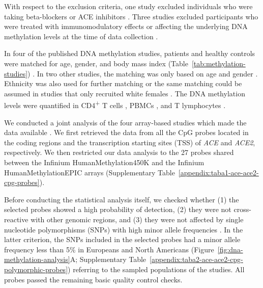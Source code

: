 With respect to the exclusion criteria, one study excluded individuals who were taking beta-blockers or ACE inhibitors \citep{trivedi2018IdentificationMyalgic}. Three studies excluded participants who were treated with immunomodulatory effects or affecting the underlying DNA methylation levels at the time of data collection \citep{vegaDNAMethylationModifications2014, vegaEpigeneticModificationsGlucocorticoid2017, herrera2018GenomeepigenomeInteractions}.

In four of the published DNA methylation studies, patients and healthy controls were matched for age, gender, and body mass index (Table~\ref{tab:methylation-studies}) \citep{vegaDNAMethylationModifications2014, vegaEpigeneticModificationsGlucocorticoid2017, trivedi2018IdentificationMyalgic}. In two other studies, the matching was only based on age and gender \citep{brenu2014MethylationProfile, helliwell2020ChangesDNA}. Ethnicity was also used for further matching \citep{trivedi2018IdentificationMyalgic, herrera2018GenomeepigenomeInteractions} or the same matching could be assumed in studies that only recruited white females \citep{vegaDNAMethylationModifications2014, vegaEpigeneticModificationsGlucocorticoid2017}. The DNA methylation levels were quantified in CD4\textsuperscript{+} T cells \citep{brenu2014MethylationProfile}, PBMCs \citep{vegaDNAMethylationModifications2014, vegaEpigeneticModificationsGlucocorticoid2017, trivedi2018IdentificationMyalgic, helliwell2020ChangesDNA}, and T lymphocytes \citep{herrera2018GenomeepigenomeInteractions}.

We conducted a joint analysis of the four array-based studies which made the data available \citep{vegaDNAMethylationModifications2014, vegaEpigeneticModificationsGlucocorticoid2017, trivedi2018IdentificationMyalgic, herrera2018GenomeepigenomeInteractions}. We first retrieved the data from all the CpG probes located in the coding regions and the transcription starting sites (TSS) of \textit{ACE} and \textit{ACE2}, respectively. We then restricted our data analysis to the 27 probes shared between the Infinium HumanMethylation450K and the Infinium HumanMethylationEPIC arrays (Supplementary Table~\ref{appendix:taba1-ace-ace2-cpg-probes}).

Before conducting the statistical analysis itself, we checked whether (1) the selected probes showed a high probability of detection, (2) they were not cross-reactive with other genomic regions, and (3) they were not affected by single nucleotide polymorphisms (SNPs) with high minor allele frequencies \citep{dedeurwaerder2014ComprehensiveOverview}. In the latter criterion, the SNPs included in the selected probes had a minor allele frequency less than 5\% in Europeans and North Americans (Figure~\ref{fig:dna-methylation-analysis}A; Supplementary Table~\ref{appendix:taba2-ace-ace2-cpg-polymorphic-probes}) referring to the sampled populations of the studies. All probes passed the remaining basic quality control checks.

